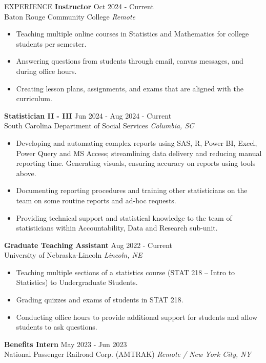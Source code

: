 \documentclass{resume} %
\begin{document}
\begin{rSection}{EXPERIENCE}
\textbf{Instructor} \hfill Oct 2024 - Current\\
Baton Rouge Community College \hfill \textit{Remote}
 \begin{itemize}
    \itemsep -1pt {}
     \item Teaching multiple online courses in Statistics and Mathematics for college students per semester.
     \item Answering questions from students through email, canvas messages, and during office hours.
     \item Creating lesson plans, assignments, and exams that are aligned with the curriculum.
 \end{itemize}
 \textbf{Statistician II - III} \hfill Jun 2024 - Aug 2024 - Current\\
South Carolina Department of Social Services \hfill \textit{Columbia, SC}
 \begin{itemize}
    \itemsep -1pt {}
     \item Developing and automating complex reports using SAS, R, Power BI, Excel, Power Query and MS Access; streamlining data delivery and reducing manual reporting time. Generating visuals, ensuring accuracy on reports using tools above.
     \item Documenting reporting procedures and training other statisticians on the team on some routine reports and ad-hoc requests.
     \item Providing technical support and statistical knowledge to the team of statisticians within Accountability, Data and Research sub-unit.
 \end{itemize}
 \textbf{Graduate Teaching Assistant} \hfill Aug 2022 - Current\\
University of Nebraska-Lincoln \hfill \textit{Lincoln, NE}
 \begin{itemize}
    \itemsep -1pt {}
     \item Teaching multiple sections of a statistics course (STAT 218 – Intro to Statistics) to Undergraduate Students.
     \item Grading quizzes and exams of students in STAT 218.
     \item Conducting office hours to provide additional support for students and allow students to ask questions.
 \end{itemize}
\textbf{Benefits Intern} \hfill May 2023 - Jun 2023\\
National Passenger Railroad Corp. (AMTRAK) \hfill \textit{Remote / New York City, NY}

\end{rSection}
\end{document}
